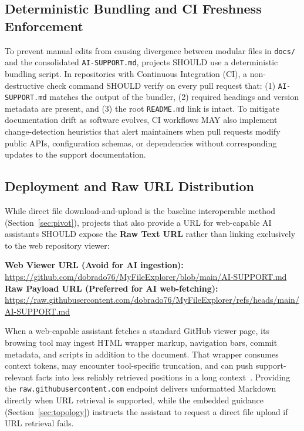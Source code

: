 \documentclass[12pt, a4paper]{article}
\newcommand{\WebSupportURL}{https://github.com/dobrado76/MyFileExplorer/blob/main/AI-SUPPORT.md}
\newcommand{\RawSupportURL}{https://raw.githubusercontent.com/dobrado76/MyFileExplorer/refs/heads/main/AI-SUPPORT.md}
\begin{document}
\subsection{Deterministic Bundling and CI Freshness Enforcement}
\label{subsec:ci_checks}
To prevent manual edits from causing divergence between modular files in \texttt{docs/} and the consolidated \texttt{AI-SUPPORT.md}, projects SHOULD use a deterministic bundling script. In repositories with Continuous Integration (CI), a non-destructive check command SHOULD verify on every pull request that: (1) \texttt{AI-SUPPORT.md} matches the output of the bundler, (2) required headings and version metadata are present, and (3) the root \texttt{README.md} link is intact. To mitigate documentation drift as software evolves, CI workflows MAY also implement change-detection heuristics that alert maintainers when pull requests modify public APIs, configuration schemas, or dependencies without corresponding updates to the support documentation.

\subsection{Deployment and Raw URL Distribution}
\label{subsec:raw_url}
While direct file download-and-upload is the baseline interoperable method (Section~\ref{sec:pivot}), projects that also provide a URL for web-capable AI assistants SHOULD expose the \textbf{Raw Text URL} rather than linking exclusively to the web repository viewer:

\vspace{0.3em}
\noindent
\scriptsize
\textbf{Web Viewer URL (Avoid for AI ingestion):} \\
\url{\WebSupportURL} \\[0.2em]
\textbf{Raw Payload URL (Preferred for AI web-fetching):} \\
\url{\RawSupportURL}
\normalsize
\vspace{0.3em}

When a web-capable assistant fetches a standard GitHub viewer page, its browsing tool may ingest HTML wrapper markup, navigation bars, commit metadata, and scripts in addition to the document. That wrapper consumes context tokens, may encounter tool-specific truncation, and can push support-relevant facts into less reliably retrieved positions in a long context~\citep{liu2024lost}. Providing the \texttt{raw.githubusercontent.com} endpoint delivers unformatted Markdown directly when URL retrieval is supported, while the embedded guidance (Section~\ref{sec:topology}) instructs the assistant to request a direct file upload if URL retrieval fails.
\end{document}
